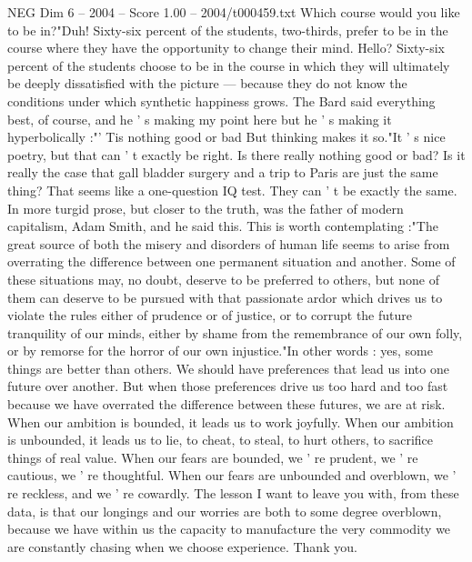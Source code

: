 \begin{textsample}{NEG Dim 6 – 2004 – Score 1.00 – 2004/t000459.txt}
Which course would you like to be in?"Duh!
Sixty-six percent of the students, two-thirds, prefer to be in the course where they have the opportunity to change their mind.
Hello?
Sixty-six percent of the students choose to be in the course in which they will ultimately be deeply dissatisfied with the picture — because they do not know the conditions under which synthetic happiness grows.
The Bard said everything best, of course, and he ' s making my point here but he ' s making it hyperbolically :"' Tis nothing good or bad But thinking makes it so."It ' s nice poetry, but that can ' t exactly be right.
Is there really nothing good or bad?
Is it really the case that gall bladder surgery and a trip to Paris are just the same thing?
That seems like a one-question IQ test.
They can ' t be exactly the same.
In more turgid prose, but closer to the truth, was the father of modern capitalism, Adam Smith, and he said this.
This is worth contemplating :"The great source of both the misery and disorders of human life seems to arise from overrating the difference between one permanent situation and another.
Some of these situations may, no doubt, deserve to be preferred to others, but none of them can deserve to be pursued with that passionate ardor which drives us to violate the rules either of prudence or of justice, or to corrupt the future tranquility of our minds, either by shame from the remembrance of our own folly, or by remorse for the horror of our own injustice."In other words : yes, some things are better than others.
We should have preferences that lead us into one future over another.
But when those preferences drive us too hard and too fast because we have overrated the difference between these futures, we are at risk.
When our ambition is bounded, it leads us to work joyfully.
When our ambition is unbounded, it leads us to lie, to cheat, to steal, to hurt others, to sacrifice things of real value.
When our fears are bounded, we ' re prudent, we ' re cautious, we ' re thoughtful.
When our fears are unbounded and overblown, we ' re reckless, and we ' re cowardly.
The lesson I want to leave you with, from these data, is that our longings and our worries are both to some degree overblown, because we have within us the capacity to manufacture the very commodity we are constantly chasing when we choose experience.
Thank you.

\end{textsample}
